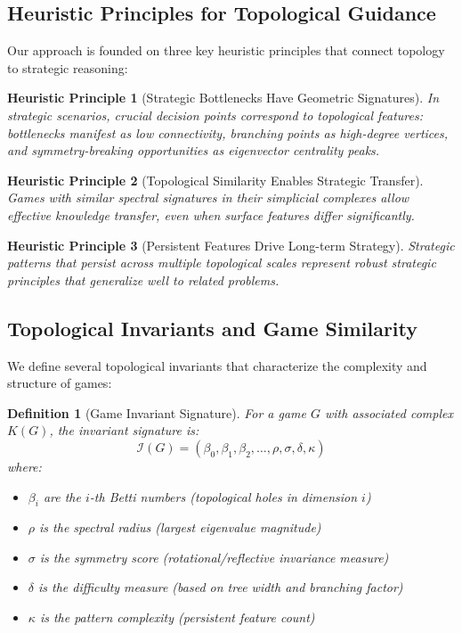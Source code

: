 \documentclass{article}
\newtheorem{definition}{Definition}
\newtheorem{heuristic}{Heuristic Principle}
\begin{document}
\subsection{Heuristic Principles for Topological Guidance}

Our approach is founded on three key heuristic principles that connect topology to strategic reasoning:

\begin{heuristic}[Strategic Bottlenecks Have Geometric Signatures]
In strategic scenarios, crucial decision points correspond to topological features: bottlenecks manifest as low connectivity, branching points as high-degree vertices, and symmetry-breaking opportunities as eigenvector centrality peaks.
\end{heuristic}

\begin{heuristic}[Topological Similarity Enables Strategic Transfer]
Games with similar spectral signatures in their simplicial complexes allow effective knowledge transfer, even when surface features differ significantly.
\end{heuristic}

\begin{heuristic}[Persistent Features Drive Long-term Strategy]
Strategic patterns that persist across multiple topological scales represent robust strategic principles that generalize well to related problems.
\end{heuristic}

\subsection{Topological Invariants and Game Similarity}

We define several topological invariants that characterize the complexity and structure of games:

\begin{definition}[Game Invariant Signature]
For a game $G$ with associated complex $K(G)$, the invariant signature is:
$$\mathcal{I}(G) = (\beta_0, \beta_1, \beta_2, \ldots, \rho, \sigma, \delta, \kappa)$$
where:
\begin{itemize}
\item $\beta_i$ are the $i$-th Betti numbers (topological holes in dimension $i$)
\item $\rho$ is the spectral radius (largest eigenvalue magnitude) 
\item $\sigma$ is the symmetry score (rotational/reflective invariance measure)
\item $\delta$ is the difficulty measure (based on tree width and branching factor)
\item $\kappa$ is the pattern complexity (persistent feature count)
\end{itemize}
\end{definition}
\end{document}
